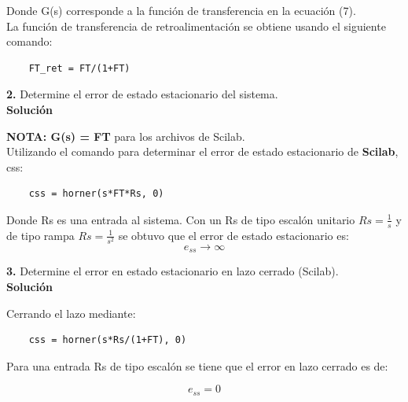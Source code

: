 \documentclass[12pt,letterpaper]{article}
\begin{document}
Donde G(s) corresponde a la función de transferencia en la ecuación (7).\\

La función de transferencia de retroalimentación se obtiene usando el siguiente comando:

\begin{verbatim}
    FT_ret = FT/(1+FT)
\end{verbatim}

\bigskip

\bigskip

\textbf{2.} Determine el error de estado estacionario del sistema.\\

\textbf{Solución}

\bigskip

\textbf{NOTA: G(s) = FT} para los archivos de Scilab.\\

Utilizando el comando para determinar el error de estado estacionario de \textbf{Scilab}, css:

\begin{verbatim}
    css = horner(s*FT*Rs, 0)
\end{verbatim}

\bigskip

Donde Rs es una entrada al sistema. Con un Rs de tipo escalón unitario $Rs = \frac{1}{s}$ y de tipo rampa $Rs = \frac{1}{s^2}$ se obtuvo que el error de estado estacionario es:
\begin{equation}
    e_{ss} \to \infty
\end{equation}

\bigskip

\bigskip

\textbf{3.}  Determine el error en estado estacionario en lazo cerrado (Scilab).\\

\textbf{Solución}

\bigskip

Cerrando el lazo mediante:


\begin{verbatim}
    css = horner(s*Rs/(1+FT), 0)
\end{verbatim}

Para una entrada Rs de tipo escalón se tiene que el error en lazo cerrado es de:

\begin{equation}
    e_{ss} = 0
\end{equation}
\end{document}
